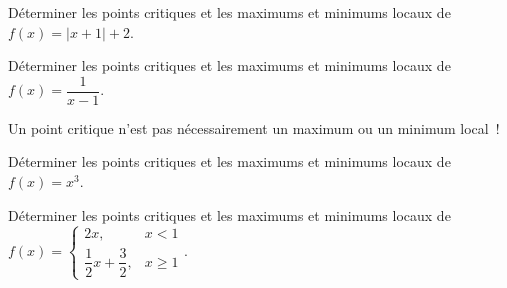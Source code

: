 \begin{exemple}
	\tcblower
	Déterminer les points critiques et les maximums et minimums locaux de $f(x)=|x+1|+2$. 
	\vspace{5cm}	
\end{exemple}

\begin{exemple}
	\tcblower
	Déterminer les points critiques et les maximums et minimums locaux de $f(x)=\dfrac{1}{x-1}$. 
	\vspace{5cm}	
\end{exemple}
\begin{remarque}
	\tcblower
	Un point critique n'est pas nécessairement un maximum ou un minimum local~!
\end{remarque}

\begin{exemple}
	\tcblower
	Déterminer les points critiques et les maximums et minimums locaux de $f(x)=x^3$. 
	\vspace{5cm}	
\end{exemple}

\begin{exemple}
	\tcblower
	Déterminer les points critiques et les maximums et minimums locaux de $f(x)=\begin{cases}2x,& x<1\\
	\dfrac{1}{2}x+\dfrac{3}{2},&x\geq 1\end{cases}$. 	
	\vspace{5cm}	
\end{exemple}

